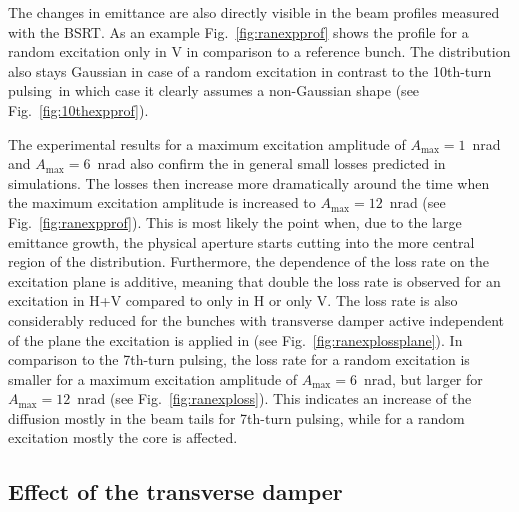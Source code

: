 \documentclass[%
 reprint,
 amsmath,amssymb,
 aps,
prstab,
longbibliography
]{revtex4-1}
\newcommand{\seventhtp}{7th-turn pulsing}
\newcommand{\tenthtp}{10th-turn pulsing}
\begin{document}
      
The changes in emittance are also directly visible in the beam
profiles measured with the BSRT. As an example
Fig.~\ref{fig:ranexpprof} shows the profile for a random excitation
only in V in comparison to a reference bunch. The distribution also
stays Gaussian in case of a random excitation in contrast to the
\tenthtp\ in which case it clearly assumes a non-Gaussian shape (see
Fig.~\ref{fig:10thexpprof}).

      
The experimental results for a maximum excitation amplitude of
$A_{\mathrm{max}}=1$~nrad and $A_{\mathrm{max}}=6$~nrad also confirm
the in general small losses predicted in simulations. The losses then
increase more dramatically around the time when the maximum excitation
amplitude is increased to $A_{\mathrm{max}}=12$~nrad (see
Fig.~\ref{fig:ranexpprof}). This is most likely the point when, due to
the large emittance growth, the physical aperture starts cutting into
the more central region of the distribution. Furthermore, the
dependence of the loss rate on the excitation plane is additive,
meaning that double the loss rate is observed for an excitation in H+V
compared to only in H or only V. The loss rate is also considerably
reduced for the bunches with transverse damper active independent of
the plane the excitation is applied in (see
Fig.~\ref{fig:ranexplossplane}). In comparison to the \seventhtp, the
loss rate for a random excitation is smaller for a maximum excitation
amplitude of $A_{\mathrm{max}}=6$~nrad, but larger for
$A_{\mathrm{max}}=12$~nrad (see Fig.~\ref{fig:ranexploss}). This
indicates an increase of the diffusion mostly in the beam tails for
\seventhtp, while for a random excitation mostly the core is affected.


\subsection{Effect of the transverse damper}
\label{sec:damp}
\end{document}
